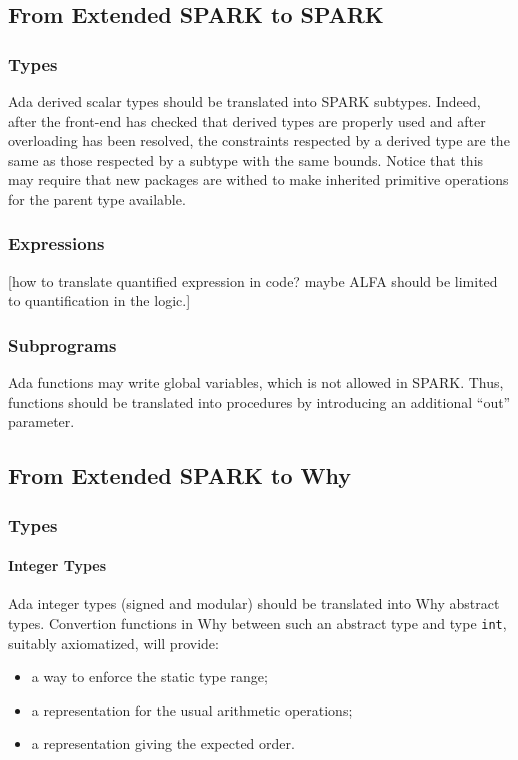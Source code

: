 \documentclass[fullpage]{article}
\begin{document}
\subsection{From Extended SPARK to SPARK}

\subsubsection{Types}

Ada derived scalar types should be translated into SPARK subtypes. Indeed,
after the front-end has checked that derived types are properly used and after
overloading has been resolved, the constraints respected by a derived type are
the same as those respected by a subtype with the same bounds. Notice that this
may require that new packages are withed to make inherited primitive operations
for the parent type available.

\subsubsection{Expressions}

[how to translate quantified expression in code? maybe ALFA should be limited
to quantification in the logic.]

\subsubsection{Subprograms}

Ada functions may write global variables, which is not allowed in SPARK. Thus,
functions should be translated into procedures by introducing an additional
``out'' parameter.

\subsection{From Extended SPARK to Why}

\subsubsection{Types}

\paragraph{Integer Types}

Ada integer types (signed and modular) should be translated into Why abstract
types. Convertion functions in Why between such an abstract type and type
\verb|int|, suitably axiomatized, will provide:
\begin{itemize}
\item a way to enforce the static type range;
\item a representation for the usual arithmetic operations;
\item a representation giving the expected order.
\end{itemize}
\end{document}
